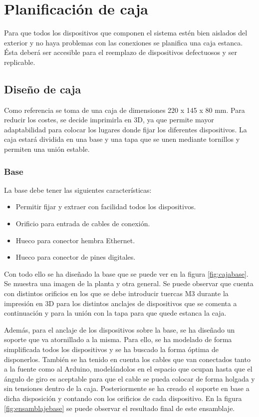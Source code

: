 \chapter{Planificación de caja}\label{chp-04}

Para que todos los dispositivos que componen el sistema estén bien aislados del exterior
y no haya problemas con las conexiones se planifica una caja estanca. Ésta deberá ser 
accesible para el reemplazo de dispositivos defectuosos y ser replicable. 

\section{Diseño de caja}

Como referencia se toma de una caja de dimensiones 220 x 145 x 80 mm. Para reducir los 
costes, se decide imprimirla en 3D, ya que permite mayor adaptabilidad para colocar 
los lugares donde fijar los diferentes dispositivos. La caja estará dividida en una base y una 
tapa que se unen mediante tornillos y permiten una unión estable.

\subsection{Base}

La base debe tener las siguientes características:
\begin{itemize}
    \item Permitir fijar y extraer con facilidad todos los dispositivos. 
    \item Orificio para entrada de cables de conexión.
    \item Hueco para conector hembra Ethernet.
    \item Hueco para conector de pines digitales.
\end{itemize} 

Con todo ello se ha diseñado la base que se puede ver en la figura \ref{fig:cajabase}. Se muestra
una imagen de la planta y otra general. Se puede observar que cuenta con distintos orificios en los
que se debe introducir tuercas M3 durante la impresión en 3D para los distintos anclajes de dispositivos
que se comenta a continuación y para la unión con la tapa para que quede estanca la caja.

Además, para el anclaje de los dispositivos sobre la base, se ha diseñado un soporte que va atornillado
a la misma. Para ello, se ha modelado de forma simplificada todos los dispositivos y se ha buscado la 
forma óptima de disponerlos. También se ha tenido en cuenta los cables que van conectados tanto a la 
fuente como al Arduino, modelándolos en el espacio que ocupan hasta que el ángulo de giro es aceptable
para que el cable se pueda colocar de forma holgada y sin tensiones dentro de la caja.
Posteriormente se ha creado el soporte en base a dicha disposición y contando con los orificios de cada
dispositivo. En la figura \ref{fig:ensamblajebase} se puede observar el resultado final de este ensamblaje.

